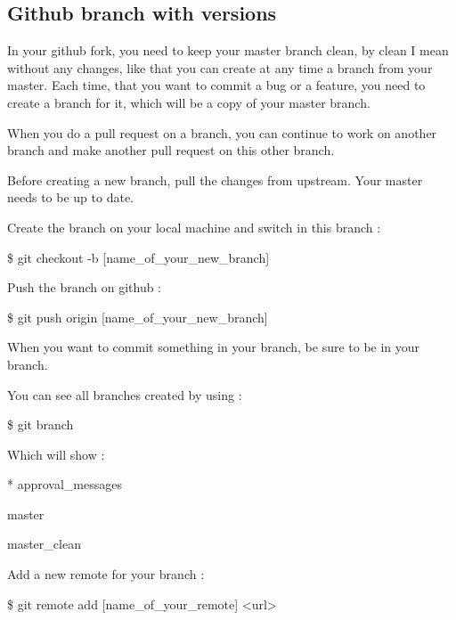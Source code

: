 \subsection*{Github branch with versions }

In your github fork, you need to keep your master branch clean, by clean I mean without any changes, like that you can create at any time a branch from your master. Each time, that you want to commit a bug or a feature, you need to create a branch for it, which will be a copy of your master branch.

When you do a pull request on a branch, you can continue to work on another branch and make another pull request on this other branch.

Before creating a new branch, pull the changes from upstream. Your master needs to be up to date.

Create the branch on your local machine and switch in this branch \-:


\begin{DoxyPre}\$ git checkout -b [name\_of\_your\_new\_branch]\end{DoxyPre}


Push the branch on github \-:


\begin{DoxyPre}\$ git push origin [name\_of\_your\_new\_branch]\end{DoxyPre}


When you want to commit something in your branch, be sure to be in your branch.

You can see all branches created by using \-:


\begin{DoxyPre}\$ git branch\end{DoxyPre}


Which will show \-:


\begin{DoxyPre}* approval\_messages\end{DoxyPre}



\begin{DoxyPre}  master\end{DoxyPre}



\begin{DoxyPre}  master\_clean\end{DoxyPre}


Add a new remote for your branch \-:


\begin{DoxyPre}\$ git remote add [name\_of\_your\_remote] <url>\end{DoxyPre}


